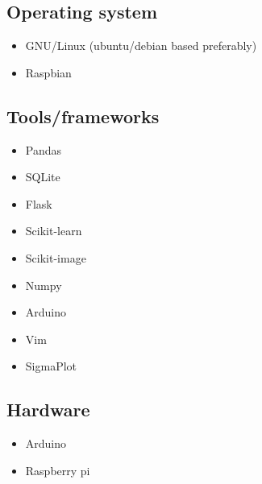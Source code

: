 \subsection{Operating system}\label{operating-system}

\begin{itemize}
\tightlist
\item
  GNU/Linux (ubuntu/debian based preferably)
\item
  Raspbian
\end{itemize}

\subsection{Tools/frameworks}\label{toolsframeworks}

\begin{itemize}
\tightlist
\item
  Pandas
\item
  SQLite
\item
  Flask
\item
  Scikit-learn
\item
  Scikit-image
\item
  Numpy
\item
  Arduino
\item
  Vim
\item
  SigmaPlot
\end{itemize}

\subsection{Hardware}\label{hardware}

\begin{itemize}
\tightlist
\item
  Arduino
\item
  Raspberry pi
\end{itemize}
